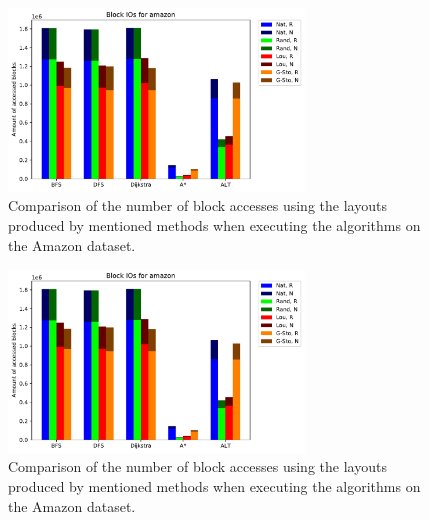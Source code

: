     \begin{figure}[htp]
        \begin{center}
            \includegraphics[keepaspectratio,width=0.7\textwidth]{img/07-eval/amazon_Block_unsorted_io_comparison.pdf}
        \end{center}
        \caption{Comparison of the number of block accesses using the layouts produced by mentioned methods when executing the algorithms on the Amazon dataset.} 
        \label{am-b}
    \end{figure}
    \begin{figure}[htp]
        \begin{center}
            \includegraphics[keepaspectratio,width=0.7\textwidth]{img/07-eval/amazon_Block_unsorted_io_comparison.pdf}
        \end{center}
        \caption{Comparison of the number of block accesses using the layouts produced by mentioned methods when executing the algorithms on the Amazon dataset.} 
        \label{am-p}
    \end{figure}
    
